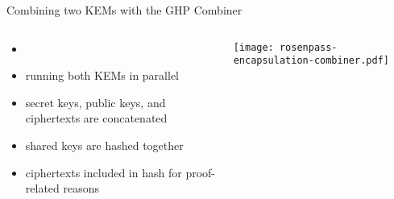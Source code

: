 




\begin{frame}{Combining two KEMs with the GHP Combiner}
  \begin{columns}[c]
    \begin{column}{.4\linewidth}
      \small
      \begin{itemize}
        \item {} \citeGhp
        \item running both KEMs in parallel
        \item secret keys, public keys, and ciphertexts are concatenated
        \item shared keys are hashed together
        \item ciphertexts included in hash for proof-related reasons
      \end{itemize}
    \end{column}
    \begin{column}{.55\linewidth}
     \texttt{[image: rosenpass-encapsulation-combiner.pdf]}
    \end{column}
  \end{columns}
\end{frame}


